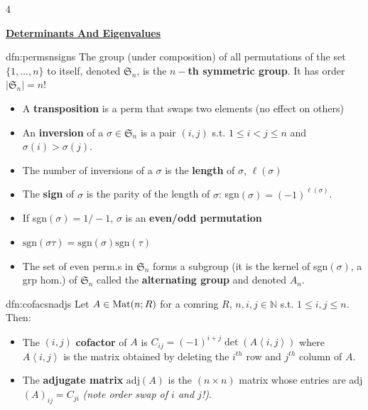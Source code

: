 \documentclass[landscape, 8pt]{extarticle}
\begin{document}
\begin{multicols*}{4}
	
	
	{\footnotesize \textbf{\underline{Determinants And Eigenvalues}}}
		
		
		
		\begin{dfn}{dfn:permsnsigns}{ }
			The group (under composition) of all permutations of the set $\{1, \dots, n\}$ to itself, denoted $\mathfrak{S}_n$, is the \textbf{$n-$th symmetric group}. It has order $\left|\mathfrak{S}_n\right| =n!$
			\begin{itemize}
				\item A \textbf{transposition} is a perm that swaps two elements (no effect on others)
				\item An \textbf{inversion} of a $\sigma \in \mathfrak{S}_n$ is a pair $(i, j)$ s.t. $1 \le i < j \le n$ and $\sigma (i) > \sigma (j)$.\\
				\item The number of inversions of a $\sigma $ is the \textbf{length} of $\sigma $, $\ell(\sigma )$
				\item The \textbf{sign} of $\sigma$ is the parity of the length of $\sigma$: sgn$(\sigma) = (-1)^{\ell(\sigma)}$. 
				\item If sgn$(\sigma) = 1/-1$, $\sigma$ is an \textbf{even/odd permutation}
				\item $\text{sgn}(\sigma \tau) = \text{sgn}(\sigma)\text{sgn}(\tau)$
				\item The set of even perm.s in $\mathfrak{S}_n$ forms a subgroup (it is the kernel of sgn$(\sigma)$, a grp hom.) of $\mathfrak{S}_n$ called the \textbf{alternating group} and denoted $A_n$.
				
			\end{itemize}
			
		\end{dfn}
		
		
		\begin{dfn}{dfn:cofacsnadjs}{ }
			Let $A \in \operatorname{Mat}(n; R)$ for a comring $R$, $n, i, j \in \mathbb{N}$ s.t. $1 \le i, j \le n$. Then: 
			\begin{itemize}
				\item The $(i, j)$ \textbf{cofactor} of $A$ is $C_{ij} = (-1)^{i + j}\det(A\left\langle i, j\right\rangle)$ where $A \left\langle i, j\right\rangle$ is the matrix obtained by deleting the $i^{th}$ row and $j^{th}$ column of $A$.
				\item The \textbf{adjugate matrix} $\text{adj}(A)$ is the $(n\times n)$ matrix whose entries are adj$(A)_{ij} = C_{ji}$ \textit{(note order swap of $i$ and $j$!)}.
			\end{itemize}
			

\end{dfn}
\end{multicols*}
\end{document}
